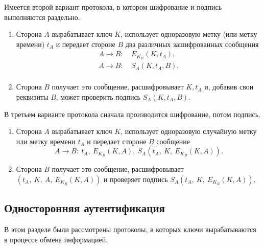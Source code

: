\documentclass[10pt,a4paper]{book}
\begin{document}
Имеется второй вариант протокола, в котором шифрование и подпись выполняются раздельно.
\begin{enumerate}
    \item Сторона $A$ вырабатывает ключ $K$, использует одноразовую метку (или метку времени) $t_{A}$ и передает стороне $B$ два различных зашифрованных сообщения
            \[ \begin{array}{ll}
                A \rightarrow B: & ~ E_{K_B}(K, t_A), \\
                A \rightarrow B: & ~ S_A(K, t_A, B). \\
            \end{array} \]
    \item Сторона $B$ получает это сообщение, расшифровывает $K, t_A$ и, добавив свои реквизиты $B$, может проверить подпись $S_A(K, t_A, B)$.
\end{enumerate}

В третьем варианте протокола сначала производится шифрование, потом подпись.
\begin{enumerate}
    \item Сторона $A$ вырабатывает ключ $K$, использует одноразовую случайную метку или метку времени $t_A$ и передает стороне $B$ сообщение
        \[ A \rightarrow B: ~ t_A, ~ E_{K_B}(K, A), ~ S_A(t_A, ~ K, ~ E_{K_B}(K, A)). \]
    \item Сторона $B$ получает это сообщение, расшифровывает $\left( t_A, ~ K, ~ A, ~ E_{K_B}(K, A) \right)$ и проверяет подпись $S_A(t_A, ~ K, ~ E_{K_B}(K, A))$.
\end{enumerate}




\subsection{Односторонняя аутентификация}









В этом разделе были рассмотрены протоколы, в которых ключи вырабатываются в процессе обмена информацией.
\end{document}

